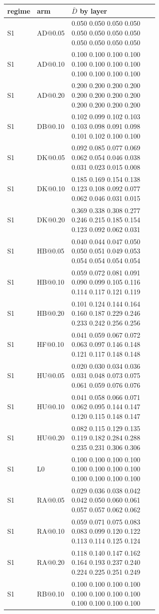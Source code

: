 \documentclass[11pt]{article}
\begin{document}
\begin{longtable}{ll p{0.62\linewidth}}\toprule regime & arm & $\bar D$ by layer\\\midrule\endhead
S1 & AD@0.05 & 0.050 0.050 0.050 0.050 0.050 0.050 0.050 0.050 0.050 0.050 0.050 0.050\\
S1 & AD@0.10 & 0.100 0.100 0.100 0.100 0.100 0.100 0.100 0.100 0.100 0.100 0.100 0.100\\
S1 & AD@0.20 & 0.200 0.200 0.200 0.200 0.200 0.200 0.200 0.200 0.200 0.200 0.200 0.200\\
S1 & DB@0.10 & 0.102 0.099 0.102 0.103 0.103 0.098 0.091 0.098 0.101 0.102 0.100 0.100\\
S1 & DK@0.05 & 0.092 0.085 0.077 0.069 0.062 0.054 0.046 0.038 0.031 0.023 0.015 0.008\\
S1 & DK@0.10 & 0.185 0.169 0.154 0.138 0.123 0.108 0.092 0.077 0.062 0.046 0.031 0.015\\
S1 & DK@0.20 & 0.369 0.338 0.308 0.277 0.246 0.215 0.185 0.154 0.123 0.092 0.062 0.031\\
S1 & HB@0.05 & 0.040 0.044 0.047 0.050 0.050 0.051 0.049 0.053 0.054 0.054 0.054 0.054\\
S1 & HB@0.10 & 0.059 0.072 0.081 0.091 0.090 0.099 0.105 0.116 0.114 0.117 0.121 0.119\\
S1 & HB@0.20 & 0.101 0.124 0.144 0.164 0.160 0.187 0.229 0.246 0.233 0.242 0.256 0.256\\
S1 & HF@0.10 & 0.041 0.059 0.067 0.072 0.063 0.097 0.146 0.148 0.121 0.117 0.148 0.148\\
S1 & HU@0.05 & 0.020 0.030 0.034 0.036 0.031 0.048 0.073 0.075 0.061 0.059 0.076 0.076\\
S1 & HU@0.10 & 0.041 0.058 0.066 0.071 0.062 0.095 0.144 0.147 0.120 0.115 0.148 0.147\\
S1 & HU@0.20 & 0.082 0.115 0.129 0.135 0.119 0.182 0.284 0.288 0.235 0.231 0.306 0.306\\
S1 & L0 & 0.100 0.100 0.100 0.100 0.100 0.100 0.100 0.100 0.100 0.100 0.100 0.100\\
S1 & RA@0.05 & 0.029 0.036 0.038 0.042 0.042 0.050 0.060 0.061 0.057 0.057 0.062 0.062\\
S1 & RA@0.10 & 0.059 0.071 0.075 0.083 0.083 0.099 0.120 0.122 0.113 0.114 0.125 0.124\\
S1 & RA@0.20 & 0.118 0.140 0.147 0.162 0.164 0.193 0.237 0.240 0.224 0.225 0.251 0.249\\
S1 & RB@0.10 & 0.100 0.100 0.100 0.100 0.100 0.100 0.100 0.100 0.100 0.100 0.100 0.100\\

\end{longtable}
\end{document}
